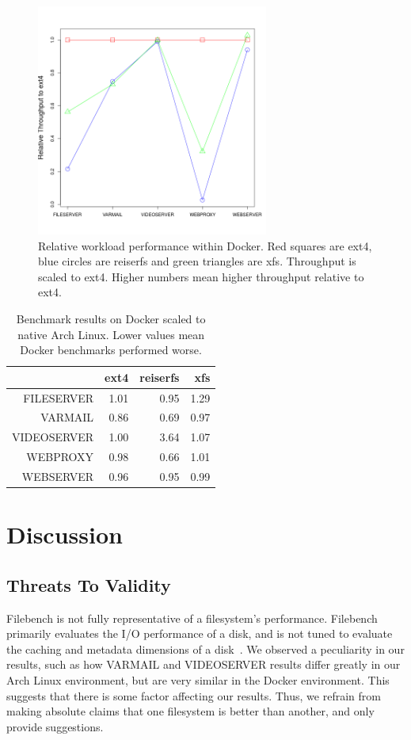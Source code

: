 \documentclass[letterpaper,twocolumn,10pt]{article}
\begin{document}
\begin{figure}[!ht]
\centering
\includegraphics[width=3in]{../results/dock_relative_performance.png}
\caption{Relative workload performance within Docker. Red squares are ext4, blue circles are reiserfs and green triangles are xfs. Throughput is scaled to ext4. Higher numbers mean higher throughput relative to ext4.}
\label{fig:dock_relative_performance}
\end{figure}

\begin{table}[ht]
\centering
\begin{tabular}{rrrr}
  \hline
 & ext4 & reiserfs & xfs \\ 
  \hline
FILESERVER & 1.01 & 0.95 & 1.29 \\ 
  VARMAIL & 0.86 & 0.69 & 0.97 \\ 
  VIDEOSERVER & 1.00 & 3.64 & 1.07 \\ 
  WEBPROXY & 0.98 & 0.66 & 1.01 \\ 
  WEBSERVER & 0.96 & 0.95 & 0.99 \\ 
   \hline
\end{tabular}
\caption{Benchmark results on Docker scaled to native Arch Linux. Lower values mean Docker benchmarks performed worse.}
\label{tab:dock_relative_arch}
\end{table}


\section{Discussion}
\subsection{Threats To Validity}
Filebench is not fully representative of a filesystem's performance. Filebench primarily evaluates the I/O performance of a disk, and is not tuned to evaluate the caching and metadata dimensions of a disk~\cite{tarasov2011benchmarking}. We observed a peculiarity in our results, such as how VARMAIL and VIDEOSERVER results differ greatly in our Arch Linux environment, but are very similar in the Docker environment. This suggests that there is some factor affecting our results. Thus, we refrain from making absolute claims that one filesystem is better than another, and only provide suggestions. 
\end{document}
